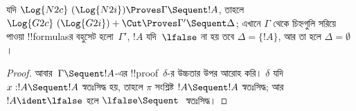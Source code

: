\documentclass[../../../include/open-logic-section]{subfiles}
\begin{document}


\begin{prop}
যদি $\Log{N2c}\ (\Log{N2i}) \Proves
\Gamma \Sequent !A$, তাহলে
$\Log{G2c}\ (\Log{G2i}) + \Cut \Proves
\Gamma' \Sequent \Delta$; এখানে
$\Gamma$ থেকে চিহ্নগুলি সরিয়ে পাওয়া
!!{formula}sর বহুসেট হলো~$\Gamma'$,
$!A$ যদি~$\lfalse$ না হয় তবে
$\Delta = \{!A\}$, আর তা হলে
$\Delta = \emptyset$।
\end{prop}

\begin{proof}
আবার~$\Gamma \Sequent !A$-এর
!!{proof}~$\delta$-র উচ্চতার উপর আরোহ করি।
$\delta$ যদি $x:!A \Sequent !A$ স্বতঃসিদ্ধ
হয়, তাহলে $\pi$ সংশ্লিষ্ট
$!A \Sequent !A$ স্বতঃসিদ্ধ; আর
$!A \ident \lfalse$ হলে
$\lfalse \Sequent \ $ স্বতঃসিদ্ধ।


\end{proof}
\end{document}
